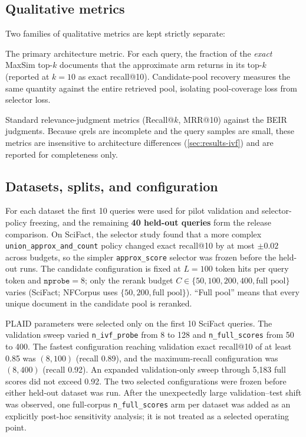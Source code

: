 \subsection{Qualitative metrics}
\label{sec:metrics}

Two families of qualitative metrics are kept strictly separate:

\begin{description}[noitemsep]
  \item[Exact-ranking recovery.] The primary architecture metric. For each
    query, the fraction of the \emph{exact} MaxSim top-$k$ documents that the
    approximate arm returns in its top-$k$ (reported at $k = 10$ as exact
    recall@10). Candidate-pool recovery measures the same quantity against the
    entire retrieved pool, isolating pool-coverage loss from selector loss.
  \item[Qrels metrics.] Standard relevance-judgment metrics (Recall@$k$,
    MRR@10) against the BEIR judgments. Because qrels are incomplete and the
    query samples are small, these metrics are insensitive to architecture
    differences (\cref{sec:results-ivf}) and are reported for completeness
    only.
\end{description}

\subsection{Datasets, splits, and configuration}

For each dataset the first 10 queries were used for pilot validation and
selector-policy freezing, and the remaining \textbf{40 held-out queries} form
the release comparison. On SciFact, the selector study found that a more
complex \texttt{union\_approx\_and\_count} policy changed exact recall@10 by
at most $\pm 0.02$ across budgets, so the simpler \texttt{approx\_score}
selector was frozen before the held-out runs. The candidate configuration is
fixed at $L = 100$ token hits per query token and $\texttt{nprobe} = 8$; only
the rerank budget $C \in \{50, 100, 200, 400, \text{full pool}\}$ varies
(SciFact; NFCorpus uses $\{50, 200, \text{full pool}\}$). ``Full pool'' means
that every unique document in the candidate pool is reranked.

PLAID parameters were selected only on the first 10 SciFact queries. The
validation sweep varied \texttt{n\_ivf\_probe} from 8 to 128 and
\texttt{n\_full\_scores} from 50 to 400. The fastest configuration reaching
validation exact recall@10 of at least 0.85 was $(8,100)$ (recall 0.89), and
the maximum-recall configuration was $(8,400)$ (recall 0.92). An expanded
validation-only sweep through 5{,}183 full scores did not exceed 0.92. The two
selected configurations were frozen before either held-out dataset was run.
After the unexpectedly large validation--test shift was observed, one
full-corpus \texttt{n\_full\_scores} arm per dataset was added as an explicitly
post-hoc sensitivity analysis; it is not treated as a selected operating point.

